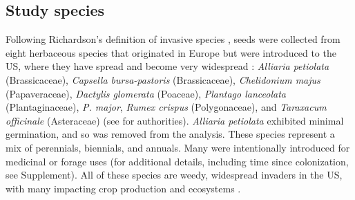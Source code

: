 \documentclass[11pt]{article}\usepackage[]{graphicx}\usepackage[]{color}
\begin{document}
	\subsection{Study species}
	Following Richardson's definition of invasive species \parencite[][, see Supplement for details]{Richardson2000, Richardson2011}, seeds were collected from eight herbaceous species that originated in Europe but were introduced to the US, where they have spread and become very widespread  \parencite{Uva1997}:\textit{ Alliaria petiolata} (Brassicaceae), \textit{Capsella bursa-pastoris} (Brassicaceae), \textit{Chelidonium majus} (Papaveraceae), \textit{Dactylis glomerata} (Poaceae),  \textit{Plantago lanceolata} (Plantaginaceae), \textit{P.  major}, \textit{Rumex crispus} (Polygonaceae), and \textit{Taraxacum officinale} (Asteraceae) (see \textcite{Haines2011} for authorities). \textit{Alliaria petiolata} exhibited minimal germination, and so was removed from the analysis. These species represent a mix of perennials, biennials, and annuals. Many were intentionally introduced for medicinal or forage uses (for additional details, including time since colonization, see Supplement).  All of these species are weedy, widespread invaders in the US, with many impacting crop production and ecosystems \parencite[e.g.,][]{Froese2003,Wolfe2008}. 
\end{document}
